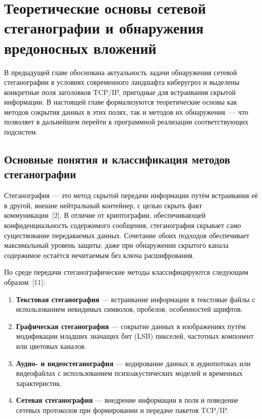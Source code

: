 \section{Теоретические основы сетевой стеганографии и обнаружения вредоносных вложений}

В предыдущей главе обоснована актуальность задачи обнаружения сетевой стеганографии в условиях современного ландшафта киберугроз и выделены конкретные поля заголовков TCP/IP, пригодные для встраивания скрытой информации. В настоящей главе формализуются теоретические основы как методов сокрытия данных в этих полях, так и методов их обнаружения~--- что позволяет в дальнейшем перейти к программной реализации соответствующих подсистем.

\subsection{Основные понятия и классификация методов стеганографии}

Стеганография --- это метод скрытой передачи информации путём встраивания её в другой, внешне нейтральный контейнер, с целью скрыть факт коммуникации~[2]. В отличие от криптографии, обеспечивающей конфиденциальность содержимого сообщения, стеганография скрывает само существование передаваемых данных. Сочетание обоих подходов обеспечивает максимальный уровень защиты: даже при обнаружении скрытого канала содержимое остаётся нечитаемым без ключа расшифрования.

По среде передачи стеганографические методы классифицируются следующим образом~[11]:

\begin{enumerate}[label=\arabic*)]
  \item \textbf{Текстовая стеганография} --- встраивание информации в текстовые файлы с использованием невидимых символов, пробелов, особенностей шрифтов.
  \item \textbf{Графическая стеганография} --- сокрытие данных в изображениях путём модификации младших значащих бит (LSB) пикселей, частотных компонент или цветовых каналов.
  \item \textbf{Аудио- и видеостеганография} --- кодирование данных в аудиопотоках или видеофайлах с использованием психоакустических моделей и временны\'{х} характеристик.
  \item \textbf{Сетевая стеганография} --- внедрение информации в поля и поведение сетевых протоколов при формировании и передаче пакетов TCP/IP.
\end{enumerate}


